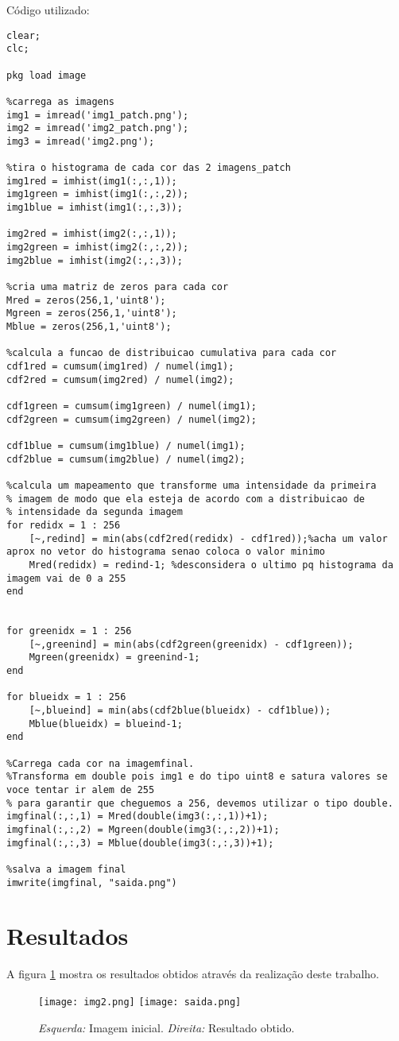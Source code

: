 Código utilizado:
\begin{lstlisting}[style=Matlab-editor]
clear;
clc;

pkg load image

%carrega as imagens
img1 = imread('img1_patch.png');
img2 = imread('img2_patch.png');
img3 = imread('img2.png');

%tira o histograma de cada cor das 2 imagens_patch
img1red = imhist(img1(:,:,1));
img1green = imhist(img1(:,:,2));
img1blue = imhist(img1(:,:,3));

img2red = imhist(img2(:,:,1));
img2green = imhist(img2(:,:,2));
img2blue = imhist(img2(:,:,3));

%cria uma matriz de zeros para cada cor
Mred = zeros(256,1,'uint8');
Mgreen = zeros(256,1,'uint8');
Mblue = zeros(256,1,'uint8');

%calcula a funcao de distribuicao cumulativa para cada cor
cdf1red = cumsum(img1red) / numel(img1);
cdf2red = cumsum(img2red) / numel(img2);

cdf1green = cumsum(img1green) / numel(img1);
cdf2green = cumsum(img2green) / numel(img2);

cdf1blue = cumsum(img1blue) / numel(img1);
cdf2blue = cumsum(img2blue) / numel(img2);

%calcula um mapeamento que transforme uma intensidade da primeira
% imagem de modo que ela esteja de acordo com a distribuicao de
% intensidade da segunda imagem
for redidx = 1 : 256
    [~,redind] = min(abs(cdf2red(redidx) - cdf1red));%acha um valor aprox no vetor do histograma senao coloca o valor minimo
    Mred(redidx) = redind-1; %desconsidera o ultimo pq histograma da imagem vai de 0 a 255
end


for greenidx = 1 : 256
    [~,greenind] = min(abs(cdf2green(greenidx) - cdf1green));
    Mgreen(greenidx) = greenind-1;
end

for blueidx = 1 : 256
    [~,blueind] = min(abs(cdf2blue(blueidx) - cdf1blue));
    Mblue(blueidx) = blueind-1;
end

%Carrega cada cor na imagemfinal.
%Transforma em double pois img1 e do tipo uint8 e satura valores se voce tentar ir alem de 255
% para garantir que cheguemos a 256, devemos utilizar o tipo double. 
imgfinal(:,:,1) = Mred(double(img3(:,:,1))+1);
imgfinal(:,:,2) = Mgreen(double(img3(:,:,2))+1);
imgfinal(:,:,3) = Mblue(double(img3(:,:,3))+1);

%salva a imagem final
imwrite(imgfinal, "saida.png")

\end{lstlisting}

\section*{Resultados}

A figura \ref{fig:result1} mostra os resultados obtidos através da realização deste trabalho.

\begin{figure}[h]
    \centering
    \texttt{[image: img2.png]}
    \texttt{[image: saida.png]}
    \caption{\emph{Esquerda:} Imagem inicial. \emph{Direita:} Resultado obtido.}
    \label{fig:result1}
\end{figure}



